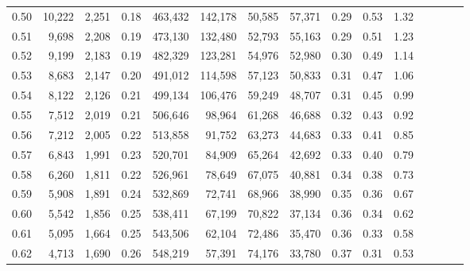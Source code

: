 \begin{tabular}{rrrcrrrrrrrrrrr}
0.50 &  10,222 &  2,251 &                                       0.18 &  463,432 &  142,178 &   50,585 &   57,371 &  0.29 &  0.53 &                         1.32 \\
0.51 &   9,698 &  2,208 &                                       0.19 &  473,130 &  132,480 &   52,793 &   55,163 &  0.29 &  0.51 &                         1.23 \\
0.52 &   9,199 &  2,183 &                                       0.19 &  482,329 &  123,281 &   54,976 &   52,980 &  0.30 &  0.49 &                         1.14 \\
0.53 &   8,683 &  2,147 &                                       0.20 &  491,012 &  114,598 &   57,123 &   50,833 &  0.31 &  0.47 &                         1.06 \\
0.54 &   8,122 &  2,126 &                                       0.21 &  499,134 &  106,476 &   59,249 &   48,707 &  0.31 &  0.45 &                         0.99 \\
0.55 &   7,512 &  2,019 &                                       0.21 &  506,646 &   98,964 &   61,268 &   46,688 &  0.32 &  0.43 &                         0.92 \\
0.56 &   7,212 &  2,005 &                                       0.22 &  513,858 &   91,752 &   63,273 &   44,683 &  0.33 &  0.41 &                         0.85 \\
0.57 &   6,843 &  1,991 &                                       0.23 &  520,701 &   84,909 &   65,264 &   42,692 &  0.33 &  0.40 &                         0.79 \\
0.58 &   6,260 &  1,811 &                                       0.22 &  526,961 &   78,649 &   67,075 &   40,881 &  0.34 &  0.38 &                         0.73 \\
0.59 &   5,908 &  1,891 &                                       0.24 &  532,869 &   72,741 &   68,966 &   38,990 &  0.35 &  0.36 &                         0.67 \\
0.60 &   5,542 &  1,856 &                                       0.25 &  538,411 &   67,199 &   70,822 &   37,134 &  0.36 &  0.34 &                         0.62 \\
0.61 &   5,095 &  1,664 &                                       0.25 &  543,506 &   62,104 &   72,486 &   35,470 &  0.36 &  0.33 &                         0.58 \\
0.62 &   4,713 &  1,690 &                                       0.26 &  548,219 &   57,391 &   74,176 &   33,780 &  0.37 &  0.31 &                         0.53 \\

\end{tabular}
